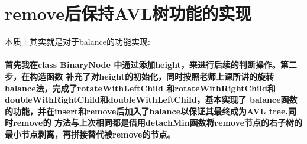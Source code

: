 \documentclass[UTF8]{ctexart}
\begin{document}
\pagestyle{fancy}
\fancyhead{}
\setlength{\headheight}{12.64723pt}

\section{remove后保持AVL树功能的实现}
本质上其实就是对于balance的功能实现:\par

\paragraph{
首先我在class BinaryNode 中通过添加height，来进行后续的判断操作。第二步，在构造函数
补充了对height的初始化，同时按照老师上课所讲的旋转balance法，完成了rotateWithLeftChild
和rotateWithRightChild和doubleWithRightChild和doubleWithLeftChild，基本实现了
balance函数的功能，并在insert和remove后加入了balance以保证其最终成为AVL tree.同时remove的
方法与上次相同都是借用detachMin函数将remove节点的右子树的最小节点剥离，再拼接替代被remove的节点。}
\end{document}
